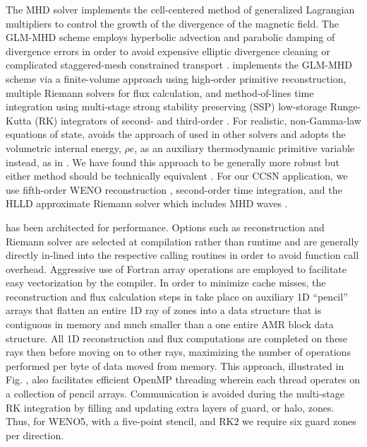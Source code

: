 The \spark MHD solver \citep{Couch:2017} implements the cell-centered method of generalized Lagrangian multipliers \citep[GLM;][]{Dedner:2002, Mignone:2010} to control the growth of the divergence of the magnetic field.
The GLM-MHD scheme employs hyperbolic advection and parabolic damping of divergence errors in order to avoid expensive elliptic divergence cleaning \citep[e.g.,][]{Jiang:1999} or complicated staggered-mesh constrained transport \citep[e.g.,][]{Gardiner:2005, Lee:2009a, Lee:2013}.
\spark implements the GLM-MHD scheme via a finite-volume approach using high-order primitive reconstruction, multiple Riemann solvers for flux calculation, and method-of-lines time integration using multi-stage strong stability preserving (SSP) low-storage Runge-Kutta (RK) integrators of second- and third-order \citep[e.g.,][]{Gottlieb:1998}.
For realistic, non-Gamma-law equations of state, \spark avoids the approach of \citet{Colella:1985} used in other \flash solvers and adopts the volumetric internal energy, $\rho e$, as an auxiliary thermodynamic primitive variable instead, as in \citet{Almgren:2010}.
We have found this approach to be generally more robust but either method should be technically equivalent \citep[e.g.,][]{Zingale:2015}.
For our CCSN application, we use fifth-order WENO reconstruction \citep{Borges:2008}, second-order time integration, and the HLLD approximate Riemann solver which includes MHD waves \citep{Miyoshi:2005}.

\spark has been architected for performance.
Options such as reconstruction and Riemann solver are selected at compilation rather than runtime and are generally directly in-lined into the respective calling routines in order to avoid function call overhead.
Aggressive use of Fortran array operations are employed to facilitate easy vectorization by the compiler.
In order to minimize cache misses, the reconstruction and flux calculation steps in \spark take place on auxiliary 1D ``pencil'' arrays that flatten an entire 1D ray of zones into a data structure that is contiguous in memory and much smaller than a one entire AMR block data structure.
All 1D reconstruction and flux computations are completed on these rays then before moving on to other rays, maximizing the number of operations performed per byte of data moved from memory.
This approach, illustrated in Fig. , also facilitates efficient OpenMP threading wherein each thread operates on a collection of pencil arrays.
Communication is avoided during the multi-stage RK integration by filling and updating extra layers of guard, or halo, zones.
Thus, for WENO5, with a five-point stencil, and RK2 we require six guard zones per direction.

